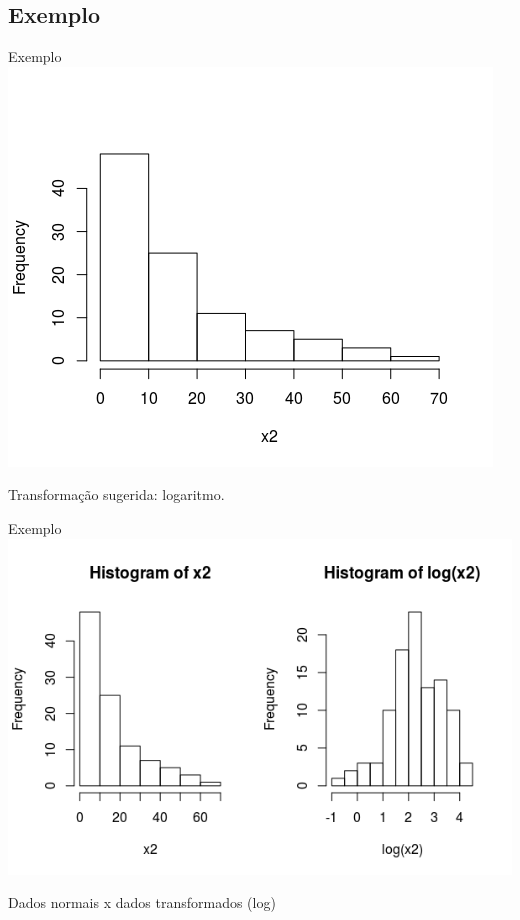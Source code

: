 \documentclass{beamer}
\begin{document}
\subsection{Exemplo}

\begin{frame}{Exemplo}
  \centering
  \includegraphics[width=.8\textwidth]{Nao_Param/lognormal1-h}

Transformação sugerida: logaritmo.
\end{frame}

\begin{frame}{Exemplo}
  \centering
  \includegraphics[width=\textwidth]{Nao_Param/transf-h}

Dados normais x dados transformados (log)
\end{frame}
\end{document}
